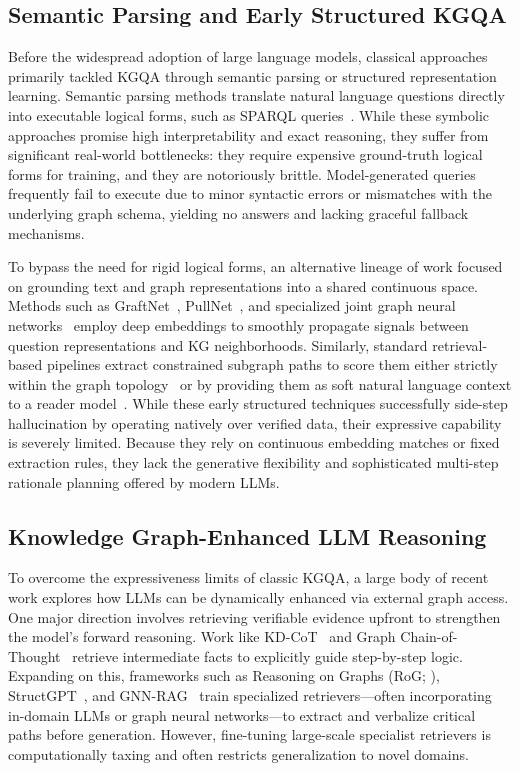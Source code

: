 \subsection{Semantic Parsing and Early Structured KGQA}

Before the widespread adoption of large language models, classical approaches primarily tackled KGQA through semantic parsing or structured representation learning. Semantic parsing methods translate natural language questions directly into executable logical forms, such as SPARQL queries~\citep{lan2020sparql, yu2023decaf}. While these symbolic approaches promise high interpretability and exact reasoning, they suffer from significant real-world bottlenecks: they require expensive ground-truth logical forms for training, and they are notoriously brittle. Model-generated queries frequently fail to execute due to minor syntactic errors or mismatches with the underlying graph schema, yielding no answers and lacking graceful fallback mechanisms.

To bypass the need for rigid logical forms, an alternative lineage of work focused on grounding text and graph representations into a shared continuous space. Methods such as GraftNet~\citep{sun2018graftnet}, PullNet~\citep{sun2019pullnet}, and specialized joint graph neural networks~\citep{yasunaga2021qagnn, he2021nsm} employ deep embeddings to smoothly propagate signals between question representations and KG neighborhoods. Similarly, standard retrieval-based pipelines extract constrained subgraph paths to score them either strictly within the graph topology~\citep{he2021multihop, saxena2022kgqa} or by providing them as soft natural language context to a reader model~\citep{shi2021kgpath}. While these early structured techniques successfully side-step hallucination by operating natively over verified data, their expressive capability is severely limited. Because they rely on continuous embedding matches or fixed extraction rules, they lack the generative flexibility and sophisticated multi-step rationale planning offered by modern LLMs.

\subsection{Knowledge Graph-Enhanced LLM Reasoning}

To overcome the expressiveness limits of classic KGQA, a large body of recent work explores how LLMs can be dynamically enhanced via external graph access. One major direction involves retrieving verifiable evidence upfront to strengthen the model's forward reasoning. Work like KD-CoT~\citep{wang2023kdcot} and Graph Chain-of-Thought~\citep{jin2024graphcot} retrieve intermediate facts to explicitly guide step-by-step logic. Expanding on this, frameworks such as Reasoning on Graphs (RoG; \citealt{luo2024rog}), StructGPT~\citep{jiang2023structgpt}, and GNN-RAG~\citep{mavromatis2024gnnrag} train specialized retrievers---often incorporating in-domain LLMs or graph neural networks---to extract and verbalize critical paths before generation. However, fine-tuning large-scale specialist retrievers is computationally taxing and often restricts generalization to novel domains.

